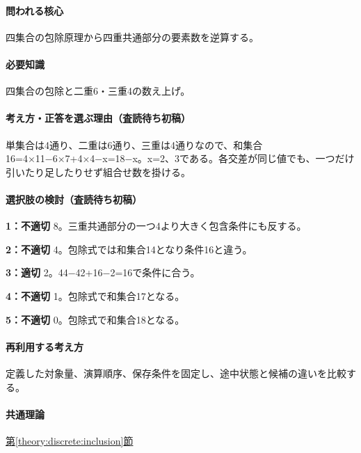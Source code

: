 \paragraph{問われる核心} 四集合の包除原理から四重共通部分の要素数を逆算する。

\paragraph{必要知識} 四集合の包除と二重6・三重4の数え上げ。

\paragraph{考え方・正答を選ぶ理由（査読待ち初稿）} 単集合は4通り、二重は6通り、三重は4通りなので、和集合16=\allowbreak{}4×11−6×7+4×4−x=\allowbreak{}18−x。x=\allowbreak{}2、3である。各交差が同じ値でも、一つだけ引いたり足したりせず組合せ数を掛ける。

\paragraph{選択肢の検討（査読待ち初稿）}\mbox{}\par

\noindent\textbf{1：不適切} 8。三重共通部分の一つ4より大きく包含条件にも反する。\par

\noindent\textbf{2：不適切} 4。包除式では和集合14となり条件16と違う。\par

\noindent\textbf{3：適切} 2。44−42+16−2=\allowbreak{}16で条件に合う。\par

\noindent\textbf{4：不適切} 1。包除式で和集合17となる。\par

\noindent\textbf{5：不適切} 0。包除式で和集合18となる。\par

\paragraph{再利用する考え方} 定義した対象量、演算順序、保存条件を固定し、途中状態と候補の違いを比較する。

\paragraph{共通理論} \hyperref[theory:discrete:inclusion]{第\ref*{theory:discrete:inclusion}節}


